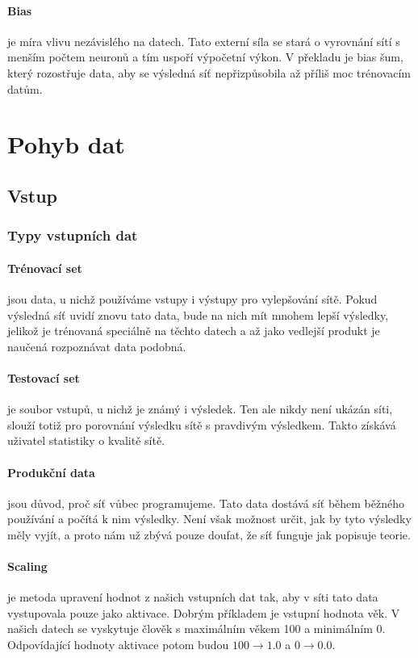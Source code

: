 \documentclass[12pt,a4paper]{report}
\begin{document}
	\paragraph{Bias}
	je míra vlivu nezávislého na datech. Tato externí síla se stará o vyrovnání sítí s menším počtem neuronů a tím uspoří výpočetní výkon. V překladu je bias šum, který rozostřuje data, aby se výsledná síť nepřizpůsobila až příliš moc trénovacím datům.
		
\section{Pohyb dat}
	\subsection{Vstup}
		\subsubsection{Typy vstupních dat}
			\paragraph{Trénovací set}
			jsou data, u nichž používáme vstupy i výstupy pro vylepšování sítě. Pokud výsledná síť uvidí znovu tato data, bude na nich mít mnohem lepší výsledky, jelikož je trénovaná speciálně na těchto datech a až jako vedlejší produkt je naučená rozpoznávat data podobná.
			\paragraph{Testovací set}
			je soubor vstupů, u nichž je známý i výsledek. Ten ale nikdy není ukázán síti, slouží totiž pro porovnání výsledku sítě s pravdivým výsledkem. Takto získává uživatel statistiky o kvalitě sítě.
			\paragraph{Produkční data}
			jsou důvod, proč síť vůbec programujeme. Tato data dostává síť během běžného používání a počítá k nim výsledky. Není však možnost určit, jak by tyto výsledky měly vyjít, a proto nám už zbývá pouze doufat, že síť funguje jak popisuje teorie.
		\paragraph{Scaling}
		je metoda upravení hodnot z našich vstupních dat tak, aby v síti tato data vystupovala pouze jako aktivace. Dobrým příkladem je vstupní hodnota věk. V našich datech se vyskytuje člověk s maximálním věkem 100 a minimálním 0. Odpovídající hodnoty aktivace potom budou $100\rightarrow1.0$ a $0\rightarrow0.0$.
\end{document}
